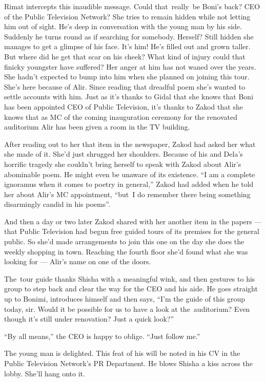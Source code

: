 \documentclass[twoside,11pt,openany]{book}
\begin{document}
Rimat intercepts this inaudible message. Could that~really~be Boni's back? CEO of the Public Television Network? She
tries to remain hidden while not letting him out of sight. He's deep in conversation with the young man by his side.
Suddenly he turns round as if searching for somebody. Herself? Still hidden she manages to get a glimpse of his face.
It's him! He's filled out and grown taller. But where did he get that scar on his cheek? What kind of injury could
that finicky youngster have suffered? Her anger at him has not waned over the years. She hadn't expected to bump into
him when she planned on joining this tour{.} She's here because of
Alir.  Since reading that dreadful poem she's wanted to settle accounts with him. Just as it's thanks to Gidal that
she knows that Boni has been appointed CEO of Public Television, it's thanks to Zakod that she knows that as MC of
the coming{ }inauguration ceremony for the renovated auditorium Alir
has been given a room in the TV building.

After reading out to her that item in the newspaper, Zakod had asked her what she made of it. She'd just shrugged her
shoulders. Because of his and Dela's horrific tragedy she couldn't bring herself to speak with Zakod about Alir's
abominable poem. He might even be unaware of its existence. ``I am a complete ignoramus when it comes to
poetry in general,'' Zakod had added when he told her about Alir's MC appointment, ``but~I
do remember there being something disarmingly candid in his poems''.

And then a day or two later Zakod shared with her another item in the papers --- that Public Television had begun free
guided tours of its premises for the general public. So she'd made arrangements to join this one on the day she does
the weekly shopping in town. Reaching the fourth floor she'd found what she was looking for --- Alir's name on one of the
doors.

The~tour guide thanks Shisha with a meaningful wink, and then gestures to his group to step back and clear the way for
the CEO and his aide. He goes straight up to Bonimi, introduces himself and then says, ``I'm the guide of
this group today, sir. Would it be possible for us to have a look at the~auditorium? Even though it's still under
renovation? Just a quick look?''

``By all means,'' the CEO is happy to oblige. ``Just follow me.''

The young man is delighted. This feat of his will be noted in his CV in the Public Television Network's PR Department.
He blows Shisha a kiss across the lobby. She'll hang onto it.
\end{document}
